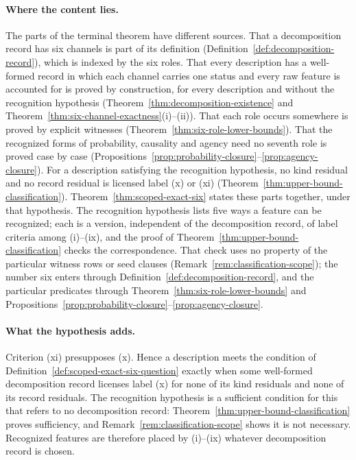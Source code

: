 \documentclass[11pt]{article}
\theoremstyle{definition}
\begin{document}
\paragraph{Where the content lies.} The parts of the terminal theorem have
different sources. That a decomposition record has six channels is part
of its definition (Definition~\ref{def:decomposition-record}), which is
indexed by the six roles. That every description has a well-formed record
in which each channel carries one status and every raw feature is
accounted for is proved by construction, for every description and
without the recognition hypothesis
(Theorem~\ref{thm:decomposition-existence} and
Theorem~\ref{thm:six-channel-exactness}(i)--(ii)). That each role occurs somewhere is
proved by explicit witnesses (Theorem~\ref{thm:six-role-lower-bounds}).
That the recognized forms of probability, causality and agency need no
seventh role is proved case by case
(Propositions~\ref{prop:probability-closure}--\ref{prop:agency-closure}).
For a description satisfying the recognition hypothesis, no kind residual
and no record residual is licensed label (x) or (xi)
(Theorem~\ref{thm:upper-bound-classification}).
Theorem~\ref{thm:scoped-exact-six} states these parts together, under
that hypothesis. The recognition hypothesis lists five ways a feature can be
recognized; each is a version, independent of the decomposition record, of
label criteria among (i)--(ix), and the proof of
Theorem~\ref{thm:upper-bound-classification} checks the correspondence. That
check uses no property of the particular witness rows or seed clauses
(Remark~\ref{rem:classification-scope}); the number six enters through
Definition~\ref{def:decomposition-record}, and the particular predicates
through Theorem~\ref{thm:six-role-lower-bounds} and
Propositions~\ref{prop:probability-closure}--\ref{prop:agency-closure}.

\paragraph{What the hypothesis adds.} Criterion (xi) presupposes (x). Hence a description meets the condition of Definition~\ref{def:scoped-exact-six-question} exactly when some well-formed decomposition record licenses label (x) for none of its kind residuals and none of its record residuals. The recognition hypothesis is a sufficient condition for this that refers to no decomposition record: Theorem~\ref{thm:upper-bound-classification} proves sufficiency, and Remark~\ref{rem:classification-scope} shows it is not necessary. Recognized features are therefore placed by (i)--(ix) whatever decomposition
record is chosen.
\end{document}
